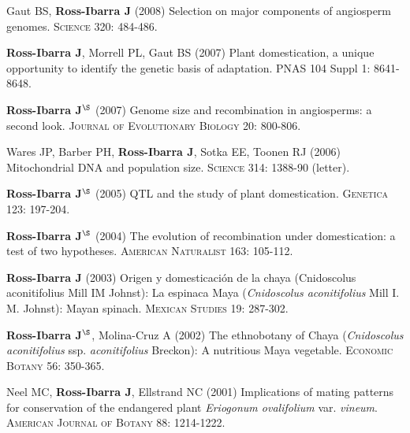 \documentclass[letterpaper,10pt]{article}
\begin{document}
\begin{etaremune}
\item Gaut BS, {\bf Ross-Ibarra J} (2008) Selection on major components of angiosperm genomes.  \textsc{Science} 320: 484-486.


\item {\bf Ross-Ibarra J}, Morrell PL, Gaut BS (2007) Plant domestication, a unique opportunity to identify the genetic basis of adaptation. PNAS 104 Suppl 1: 8641-8648.


\item {\bf Ross-Ibarra J}$^\S$ (2007) Genome size and recombination in angiosperms: a second look.  \textsc{Journal of Evolutionary Biology} 20: 800-806.


\item Wares JP, Barber PH, {\bf Ross-Ibarra J}, Sotka EE, Toonen RJ (2006) Mitochondrial DNA and population size.  \textsc{Science} 314: 1388-90 (letter).


\item {\bf Ross-Ibarra J}$^\S$ (2005) QTL and the study of plant domestication.  \textsc{Genetica} 123: 197-204.


\item {\bf Ross-Ibarra J}$^\S$ (2004) The evolution of recombination under domestication: a test of two hypotheses.  \textsc{American Naturalist} 163: 105-112.


\item {\bf Ross-Ibarra J} (2003) Origen y domesticaci\'on de la chaya (Cnidoscolus aconitifolius Mill IM Johnst): La espinaca Maya (\emph{Cnidoscolus aconitifolius} Mill I. M. Johnst): Mayan spinach.  \textsc{Mexican Studies} 19: 287-302.

\item {\bf Ross-Ibarra J}$^\S$, Molina-Cruz A (2002) The ethnobotany of Chaya (\emph{Cnidoscolus aconitifolius} ssp. \emph{aconitifolius} Breckon): A nutritious Maya vegetable. \textsc{Economic Botany} 56: 350-365.

\item  Neel MC, {\bf Ross-Ibarra J}, Ellstrand NC (2001) Implications of mating patterns for conservation of the endangered plant \emph{Eriogonum ovalifolium} var. \emph{vineum}.  \textsc{American Journal of Botany} 88: 1214-1222.
\end{etaremune}
\end{document}
